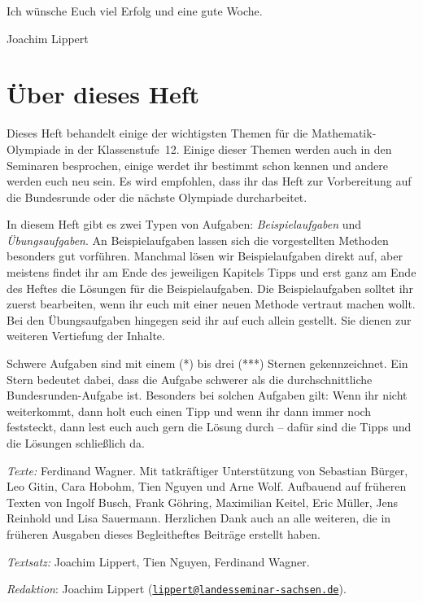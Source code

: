 \documentclass[a4paper, 12pt]{article}
\begin{document}
	Ich wünsche Euch viel Erfolg und eine gute Woche.
	
	Joachim Lippert
	
	\section*{Über dieses Heft}
	Dieses Heft behandelt einige der wichtigsten Themen für die Mathematik-Olympiade in der Klassenstufe~12. Einige dieser Themen werden auch in den Seminaren besprochen, einige werdet ihr bestimmt schon kennen und andere werden euch neu sein. Es wird empfohlen, dass ihr das Heft zur Vorbereitung auf die Bundesrunde oder die nächste Olympiade durcharbeitet.
	
	In diesem Heft gibt es zwei Typen von Aufgaben: \emph{Beispielaufgaben} und \emph{Übungsaufgaben}. An Beispielaufgaben lassen sich die vorgestellten Methoden besonders gut vorführen. Manchmal lösen wir Beispielaufgaben direkt auf, aber meistens findet ihr am Ende des jeweiligen Kapitels Tipps und erst ganz am Ende des Heftes die Lösungen für die Beispielaufgaben. Die Beispielaufgaben solltet ihr zuerst bearbeiten, wenn ihr euch mit einer neuen Methode vertraut machen wollt. Bei den Übungsaufgaben hingegen seid ihr auf euch allein gestellt. Sie dienen zur weiteren Vertiefung der Inhalte.
	
	Schwere Aufgaben sind mit einem (*) bis drei (***) Sternen gekennzeichnet. Ein Stern bedeutet dabei, dass die Aufgabe schwerer als die durchschnittliche Bundesrunden-Aufgabe ist. Besonders bei solchen Aufgaben gilt: Wenn ihr nicht weiterkommt, dann holt euch einen Tipp und wenn ihr dann immer noch feststeckt, dann lest euch auch gern die Lösung durch -- dafür sind die Tipps und die Lösungen schließlich da.
	
	
	\vfill
	
	\scriptsize
	
	\emph{Texte:} Ferdinand Wagner. Mit tatkräftiger Unterstützung von Sebastian Bürger, Leo Gitin, Cara Hobohm, Tien Nguyen und Arne Wolf. Aufbauend auf früheren Texten von Ingolf Busch, Frank Göhring, Maximilian Keitel, Eric Müller, Jens Reinhold und Lisa Sauermann. Herzlichen Dank auch an alle weiteren, die in früheren Ausgaben dieses Begleitheftes Beiträge erstellt haben.
	
	\emph{Textsatz:} Joachim Lippert, Tien Nguyen, Ferdinand Wagner.
	
	\emph{Redaktion}: Joachim Lippert (\href{mailto:lippert@landesseminar-sachsen.de}{\texttt{lippert@landesseminar-sachsen.de}}).
	\normalsize
	
\end{document}
